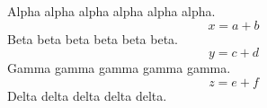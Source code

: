 \documentclass[12pt]{article}
\begin{document}
Alpha alpha alpha alpha alpha alpha.
\[ x = a + b \]
Beta beta beta beta beta beta.
\[ y = c + d \]
Gamma gamma gamma gamma gamma.
\[ z = e + f \]
Delta delta delta delta delta.
\end{document}
